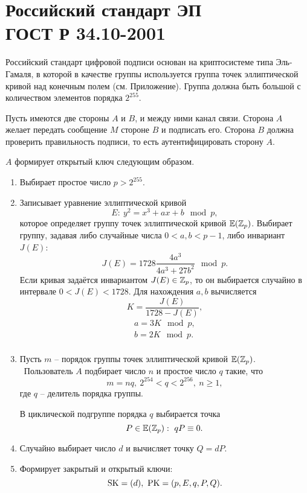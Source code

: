 \section[Российский стандарт ЭП ГОСТ Р 34.10-2001]{Российский стандарт ЭП \protect\\ ГОСТ Р 34.10-2001}

Российский стандарт цифровой подписи основан на криптосистеме типа Эль-Гамаля, в которой в качестве группы используется группа точек эллиптической кривой над конечным полем (см. Приложение). Группа должна быть большой с количеством элементов порядка $2^{255}$.

Пусть имеются две стороны $A$ и $B$, и между ними канал связи. Сторона $A$ желает передать сообщение $M$ стороне $B$ и подписать его. Сторона $B$ должна проверить правильность подписи, то есть аутентифицировать сторону $A$.

$A$ формирует открытый ключ следующим образом.

\begin{enumerate}
    \item Выбирает простое число $p > 2^{255}$.
    \item Записывает уравнение эллиптической кривой
        \[ E: ~ y^2 = x^3 + a x + b \mod p, \]
        которое определяет группу точек эллиптической кривой $\mathbb{E}(\mathbb{Z}_p)$.
        Выбирает группу, задавая либо случайные числа $0 < a, b < p-1$, либо инвариант $J(E)$:
        \[ J(E) = 1728 \frac{4 a^3}{4 a^3 + 27 b^2} \mod p. \]
        Если кривая задаётся инвариантом $J(E) \in \mathbb{Z}_p$, то он выбирается случайно в интервале $0 < J(E) < 1728$. Для нахождения $a,b$ вычисляется
        \[ K = \frac{J(E)}{1728 - J(E)}, \]
        \[ \begin{array}{l}
            a = 3 K \mod p, \\
            b = 2 K \mod p. \\
        \end{array} \]
    \item Пусть $m$ -- порядок группы точек эллиптической кривой $\mathbb{E}(\mathbb{Z}_p)$. ~Пользователь $A$ подбирает число $n$ и простое число $q$ такие, что
        \[ m = n q, ~ 2^{254} < q < 2^{256}, ~ n \geq 1, \]
        где $q$ -- делитель порядка группы.

        В циклической подгруппе порядка $q$ выбирается точка
        \[ P \in \mathbb{E}(\mathbb{Z}_p): ~ q P \equiv 0. \]
    \item Случайно выбирает число $d$ и вычисляет точку $Q = d P$.
    \item Формирует закрытый и открытый ключи:
        \[ \textrm{SK} = (d), ~ \textrm{PK} = (p, E, q, P, Q). \]
\end{enumerate}


